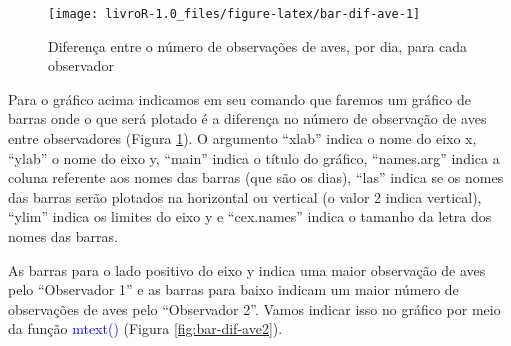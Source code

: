 \documentclass[14pt,titlepage, oneside, openany, a4paper]{book}
\newenvironment{Shaded}{\begin{snugshade}}{\end{snugshade}}
\newcommand{\DataTypeTok}[1]{\textcolor[rgb]{0.13,0.29,0.53}{#1}}
\newcommand{\DecValTok}[1]{\textcolor[rgb]{0.00,0.00,0.81}{#1}}
\newcommand{\FloatTok}[1]{\textcolor[rgb]{0.00,0.00,0.81}{#1}}
\newcommand{\KeywordTok}[1]{\textcolor[rgb]{0.13,0.29,0.53}{\textbf{#1}}}
\newcommand{\NormalTok}[1]{#1}
\newcommand{\OperatorTok}[1]{\textcolor[rgb]{0.81,0.36,0.00}{\textbf{#1}}}
\newcommand{\StringTok}[1]{\textcolor[rgb]{0.31,0.60,0.02}{#1}}
\begin{document}
\begin{figure}[H]
\texttt{[image: livroR-1.0\_files/figure-latex/bar-dif-ave-1]} \caption{Diferença entre o número de observações de aves, por dia, para cada observador}\label{fig:bar-dif-ave}
\end{figure}

Para o gráfico acima indicamos em seu comando que faremos um gráfico de barras onde o que será plotado é a diferença no número de observação de aves entre observadores (Figura \ref{fig:bar-dif-ave}). O argumento ``xlab'' indica o nome do eixo x, ``ylab'' o nome do eixo y, ``main'' indica o título do gráfico, ``names.arg'' indica a coluna referente aos nomes das barras (que são os dias), ``las'' indica se os nomes das barras serão plotados na horizontal ou vertical (o valor 2 indica vertical), ``ylim'' indica os limites do eixo y e ``cex.names'' indica o tamanho da letra dos nomes das barras.

As barras para o lado positivo do eixo y indica uma maior observação de aves pelo ``Observador 1'' e as barras para baixo indicam um maior número de observações de aves pelo ``Observador 2''. Vamos indicar isso no gráfico por meio da função \textcolor{blue}{mtext()} (Figura \ref{fig:bar-dif-ave2}).

\begin{Shaded}
\end{Shaded}
\end{document}
